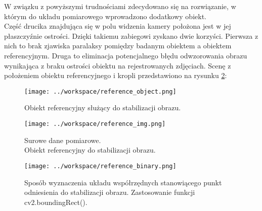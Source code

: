 \documentclass[a4paper,11pt,twoside,openright]{article} %
\begin{document}
\noindent W związku z powyższymi trudnościami zdecydowano się na rozwiązanie, w którym do układu pomiarowego wprowadzono dodatkowy obiekt.\\ \noindent Część drucika znajdująca się w polu widzenia kamery położona jest w jej płaszczyźnie ostrości. Dzięki takiemu zabiegowi zyskano dwie korzyści. Pierwsza z nich to brak zjawiska paralaksy pomiędzy badanym obiektem a obiektem referencyjnym. Druga to eliminacja potencjalnego błędu odwzorowania obrazu wynikająca z braku ostrości obiektu na rejestrowanych zdjęciach. Scenę z położeniem obiektu referencyjnego i kropli przedstawiono na rysunku \ref{fig:reference_img}:
\vspace{2mm}

\captionsetup{skip=0pt}
\begin{figure}[!h]
\captionsetup{justification=centering}
\begin{center}
\texttt{[image: ../workspace/reference\_object.png]} 
\end{center}
\caption{Obiekt referencyjny służący do stabilizacji obrazu.}
\label{fig:reference_object}
\end{figure} 

\newpage
\captionsetup{skip=0pt}
 \begin{centering}
\begin{minipage}{0.5\textwidth}
\begin{figure}[H]
\captionsetup{justification=centering}
\begin{center}
\texttt{[image: ../workspace/reference\_img.png]} 
\end{center}
\caption{\footnotesize Surowe dane pomiarowe. \\Obiekt referencyjny do stabilizacji obrazu.}
\label{fig:reference_img}
\end{figure}
\end{minipage}
  \begin{minipage}{0.5\textwidth}
\begin{figure}[H]
\captionsetup{justification=centering}
\begin{center}
\texttt{[image: ../workspace/reference\_binary.png]} 
\end{center}
\caption{\footnotesize Sposób wyznaczenia układu współrzędnych stanowiącego punkt odniesienia do stabilizacji obrazu. Zastosowanie funkcji cv2.boundingRect().}
\label{fig:reference_binary}
\end{figure}
\end{minipage} \hfill
\end{centering}
\normalsize
\end{document}
